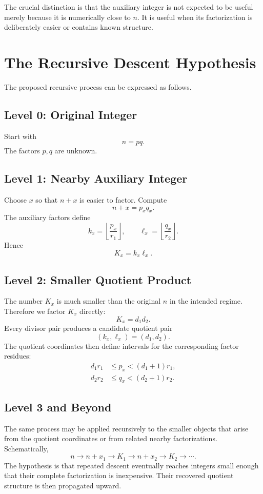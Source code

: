 \documentclass[11pt,a4paper]{article}
\begin{document}
The crucial distinction is that the auxiliary integer is not expected to
be useful merely because it is numerically close to $n$. It is useful when
its factorization is deliberately easier or contains known structure.

\section{The Recursive Descent Hypothesis}

The proposed recursive process can be expressed as follows.

\subsection{Level 0: Original Integer}

Start with
\[
    n=pq.
\]
The factors $p,q$ are unknown.

\subsection{Level 1: Nearby Auxiliary Integer}

Choose $x$ so that $n+x$ is easier to factor. Compute
\[
    n+x=p_xq_x.
\]
The auxiliary factors define
\[
    k_x=\left\lfloor\frac{p_x}{r_1}\right\rfloor,
    \qquad
    \ell_x=\left\lfloor\frac{q_x}{r_2}\right\rfloor.
\]
Hence
\[
    K_x=k_x\ell_x.
\]

\subsection{Level 2: Smaller Quotient Product}

The number $K_x$ is much smaller than the original $n$ in the intended
regime. Therefore we factor $K_x$ directly:
\[
    K_x=d_1d_2.
\]
Every divisor pair produces a candidate quotient pair
\[
    (k_x,\ell_x)=(d_1,d_2).
\]
The quotient coordinates then define intervals for the corresponding
factor residues:
\begin{align}
    d_1r_1&\le p_x<(d_1+1)r_1,\\
    d_2r_2&\le q_x<(d_2+1)r_2.
\end{align}

\subsection{Level 3 and Beyond}

The same process may be applied recursively to the smaller objects that
arise from the quotient coordinates or from related nearby factorizations.
Schematically,
\begin{equation}
\label{eq:recursive-chain}
    n
    \rightarrow
    n+x_1
    \rightarrow
    K_1
    \rightarrow
    n+x_2
    \rightarrow
    K_2
    \rightarrow\cdots.
\end{equation}
The hypothesis is that repeated descent eventually reaches integers small
enough that their complete factorization is inexpensive. Their recovered
quotient structure is then propagated upward.
\end{document}

